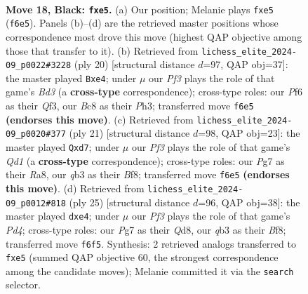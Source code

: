 \documentclass[11pt]{article}
\begin{document}
\clearpage

\begin{figure}[p]\centering
\begin{subfigure}{0.46\textwidth}\centering
\resizebox{\linewidth}{!}{%
\newchessgame
\chessboard[
  setfen={r1b1kb1r/2q3pp/1p3p2/p3N3/3p3P/1Q6/PP3PP1/RNB1R1K1 b q - 0 18},
  showmover=false,
  pgfstyle=straightmove, color=movearrow, markmove={f6-e5}
]}
\caption{}
\end{subfigure}\hfill
\begin{subfigure}{0.46\textwidth}\centering
\resizebox{\linewidth}{!}{%
\newchessgame
\chessboard[
  setfen={rn1qkb1r/pp3ppp/2p1p3/8/4nB2/2PB1Q1P/PP3PP1/R3K2R w KQkq - 0 11},
  showmover=false,
  pgfstyle=straightmove, color=movearrow, markmove={d3-e4}
]}
\caption{}
\end{subfigure}
\\[4pt]
\begin{subfigure}{0.46\textwidth}\centering
\resizebox{\linewidth}{!}{%
\newchessgame
\chessboard[
  setfen={r2qkbnr/pp1N1pp1/2p1p2p/8/3P3P/3Q2N1/PPP2PP1/R1B1K2R b KQkq - 0 11},
  showmover=false,
  pgfstyle=straightmove, color=movearrow, markmove={d8-d7}
]}
\caption{}
\end{subfigure}\hfill
\begin{subfigure}{0.46\textwidth}\centering
\resizebox{\linewidth}{!}{%
\newchessgame
\chessboard[
  setfen={r1bqkb1r/1p3p1p/p7/3pN3/3nN3/2P5/PP3PPP/R2QKB1R b KQkq - 0 13},
  showmover=false,
  pgfstyle=straightmove, color=movearrow, markmove={d5-e4}
]}
\caption{}
\end{subfigure}
\caption{\textbf{Move 18, Black: \texttt{fxe5}.} (a) Our position; Melanie plays \texttt{fxe5} (\texttt{f6e5}). Panels (b)--(d) are the retrieved master positions whose correspondence most drove this move (highest QAP objective among those that transfer to it). (b) Retrieved from \texttt{lichess\_elite\_2024-09\_p0022\#3228} (ply 20) [structural distance $d$=97, QAP obj=37]: the master played \texttt{Bxe4}; under $\mu$ our \emph{Pf3} plays the role of that game's \emph{Bd3} (a \textbf{cross-type} correspondence); cross-type roles: our \emph{P}f6 as their \emph{Q}f3, our \emph{B}c8 as their \emph{P}h3; transferred move \texttt{f6e5} \textbf{(endorses this move)}. (c) Retrieved from \texttt{lichess\_elite\_2024-09\_p0020\#377} (ply 21) [structural distance $d$=98, QAP obj=23]: the master played \texttt{Qxd7}; under $\mu$ our \emph{Pf3} plays the role of that game's \emph{Qd1} (a \textbf{cross-type} correspondence); cross-type roles: our \emph{P}g7 as their \emph{R}a8, our \emph{q}b3 as their \emph{B}f8; transferred move \texttt{f6e5} \textbf{(endorses this move)}. (d) Retrieved from \texttt{lichess\_elite\_2024-09\_p0012\#818} (ply 25) [structural distance $d$=96, QAP obj=38]: the master played \texttt{dxe4}; under $\mu$ our \emph{Pf3} plays the role of that game's \emph{Pd4}; cross-type roles: our \emph{P}g7 as their \emph{Q}d8, our \emph{q}b3 as their \emph{B}f8; transferred move \texttt{f6f5}. Synthesis: 2 retrieved analogs transferred to \texttt{fxe5} (summed QAP objective 60, the strongest correspondence among the candidate moves); Melanie committed it via the \texttt{search} selector.}
\label{fig:thought-m35}
\end{figure}
\end{document}
